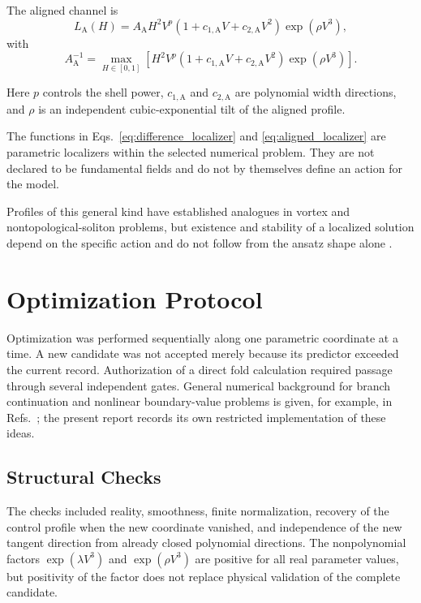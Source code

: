 \documentclass[11pt,a4paper]{article}
\newcommand{\vac}{V}
\newcommand{\host}{H}
\newcommand{\lalign}{L_{\mathrm{A}}}
\begin{document}
The aligned channel is
\begin{equation}
\lalign(\host)
=A_{\mathrm{A}}\host^2\vac^p
\left(1+c_{1,\mathrm{A}}\vac+c_{2,\mathrm{A}}\vac^2\right)
\exp\!\left(\rho\vac^3\right),
\label{eq:aligned_localizer}
\end{equation}
with
\begin{equation}
A_{\mathrm{A}}^{-1}
=\max_{\host\in[0,1]}
\left[
\host^2\vac^p
\left(1+c_{1,\mathrm{A}}\vac+c_{2,\mathrm{A}}\vac^2\right)
\exp\!\left(\rho\vac^3\right)
\right].
\end{equation}

Here $p$ controls the shell power, $c_{1,\mathrm{A}}$ and $c_{2,\mathrm{A}}$ are polynomial width directions, and $\rho$ is an independent cubic-exponential tilt of the aligned profile.

The functions in Eqs.~\eqref{eq:difference_localizer} and \eqref{eq:aligned_localizer} are parametric localizers within the selected numerical problem. They are not declared to be fundamental fields and do not by themselves define an action for the model.

Profiles of this general kind have established analogues in vortex and nontopological-soliton problems, but existence and stability of a localized solution depend on the specific action and do not follow from the ansatz shape alone \cite{derrick1964,nielsen1973,coleman1985}.

\section{Optimization Protocol}

Optimization was performed sequentially along one parametric coordinate at a time. A new candidate was not accepted merely because its predictor exceeded the current record. Authorization of a direct fold calculation required passage through several independent gates. General numerical background for branch continuation and nonlinear boundary-value problems is given, for example, in Refs.~\cite{keller1977,ascher1995}; the present report records its own restricted implementation of these ideas.

\subsection{Structural Checks}

The checks included reality, smoothness, finite normalization, recovery of the control profile when the new coordinate vanished, and independence of the new tangent direction from already closed polynomial directions. The nonpolynomial factors $\exp(\lambda\vac^3)$ and $\exp(\rho\vac^3)$ are positive for all real parameter values, but positivity of the factor does not replace physical validation of the complete candidate.
\end{document}
